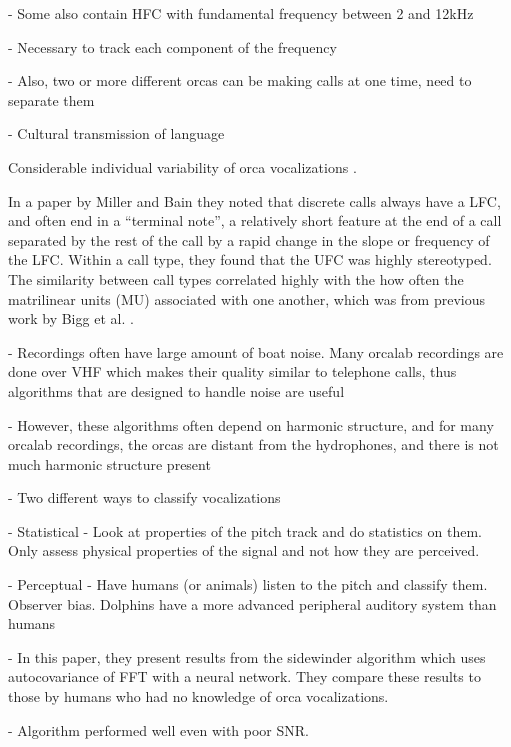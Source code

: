 - Some also contain HFC with fundamental frequency between 2 and 12kHz
\cite{hoelzel86}

- Necessary to track each component of the frequency

- Also, two or more different orcas can be making calls at one time,
need to separate them \cite{ford87}

- Cultural transmission of language \cite{deeke99}

Considerable individual variability of orca vocalizations \cite{miller00}
\cite{nousek06} \cite{parijs04}.  

In a paper by Miller and Bain \cite{miller00} they noted that discrete
calls always have a LFC, and often end in a ``terminal note'', a
relatively short feature at the end of a call separated by the rest of
the call by a rapid change in the slope or frequency of the LFC.
Within a call type, they found that the UFC was highly stereotyped.
The similarity between call types correlated highly with the how often
the matrilinear units (MU) associated with one another, which was from
previous work by Bigg et al. \cite{bigg90}.



- Recordings often have large amount of boat noise.  Many orcalab
recordings are done over VHF which makes their quality similar to
telephone calls, thus algorithms that are designed to handle noise are
useful \cite{wang00}

- However, these algorithms often depend on harmonic structure, and
for many orcalab recordings, the orcas are distant from the
hydrophones, and there is not much harmonic structure present

- Two different ways to classify vocalizations \cite{deecke99}

   - Statistical - Look at properties of the pitch track and do
   statistics on them.  Only assess physical properties of the signal
   and not how they are perceived.

   - Perceptual - Have humans (or animals) listen to the pitch and
   classify them.  Observer bias.  Dolphins have a more advanced
   peripheral auditory system than humans \cite{au00}

   - In this paper, they present results from the sidewinder
   algorithm which uses autocovariance of FFT with a neural network.
   They compare these results to those by humans who had no knowledge
   of orca vocalizations. 

   - Algorithm performed well even with poor SNR.  

